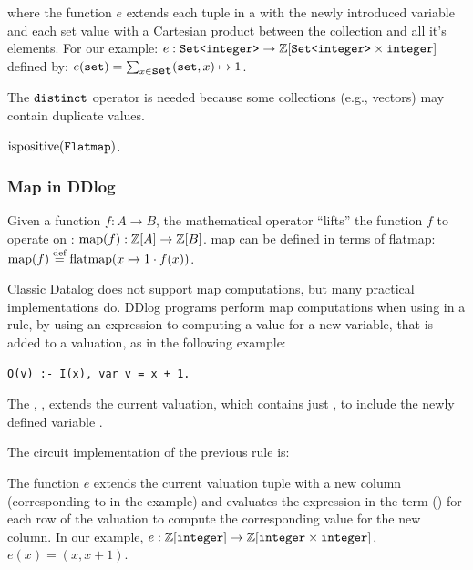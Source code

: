 \noindent where the function $e$ extends each tuple in a \zr with the newly introduced variable 
and each set value with a Cartesian product between the collection and all it's elements.
For our example: $e: \mbox{\texttt{Set<integer>}} \to \mathbb{Z}[\mbox{\texttt{Set<integer>}} \times \mbox{\texttt{integer}}]$ 
defined by: $e(\mbox{\texttt{set}}) = \sum_{x \in \mbox{\texttt{set}}} (\mbox{\texttt{set}}, x) \mapsto 1$.

The $\mbox{\texttt{distinct}}$ operator is needed because some collections (e.g., vectors)
may contain duplicate values.

\begin{proposition}
$\mbox{ispositive}(\mbox{\texttt{Flatmap}})$.
\end{proposition}

\subsubsection{Map in DDlog}\label{sec:map}

Given a function $f : A \rightarrow B$, the mathematical  operator ``lifts'' the
function $f$ to operate on \zrs: $\mbox{map}(f) : \mathbb{Z}[A] \rightarrow \mathbb{Z}[B]$.
map can be defined in terms of flatmap: $\mbox{map}(f) \stackrel{\textrm{\scriptsize def}}{=} \mbox{flatmap}(x \mapsto 1 \cdot f(x))$.

Classic Datalog does not support map computations, but many practical
implementations do.  DDlog programs perform map computations when using 
in a rule, by using an expression to computing a value for a new variable, that is added to a valuation,
as in the following example:

\begin{lstlisting}[language=ddlog]
O(v) :- I(x), var v = x + 1. 
\end{lstlisting}

The , , extends the current valuation, which
contains just , to include the newly defined variable .  

The circuit implementation of the previous rule is:


The function $e$ extends the current valuation tuple with a new column 
(corresponding to  in the example) and
evaluates the expression in the term () for each row of the valuation
to compute the corresponding value for the new column.  In our example,
$e: \mathbb{Z}[\mbox{\texttt{integer}}] \to \mathbb{Z}[\mbox{\texttt{integer}} \times \mbox{\texttt{integer}}]$,
$e(x) = (x, x+1)$.

